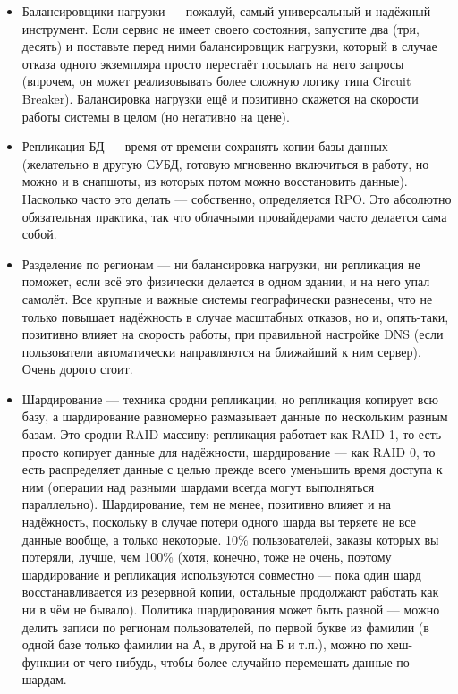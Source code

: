 \documentclass[a5paper]{article}
\begin{document}
\begin{itemize}
    \item Балансировщики нагрузки --- пожалуй, самый универсальный и надёжный инструмент. Если сервис не имеет своего состояния, запустите два (три, десять) и поставьте перед ними балансировщик нагрузки, который в случае отказа одного экземпляра просто перестаёт посылать на него запросы (впрочем, он может реализовывать более сложную логику типа Circuit Breaker). Балансировка нагрузки ещё и позитивно скажется на скорости работы системы в целом (но негативно на цене).
    \item Репликация БД --- время от времени сохранять копии базы данных (желательно в другую СУБД, готовую мгновенно включиться в работу, но можно и в снапшоты, из которых потом можно восстановить данные). Насколько часто это делать --- собственно, определяется RPO. Это абсолютно обязательная практика, так что облачными провайдерами часто делается сама собой.
    \item Разделение по регионам --- ни балансировка нагрузки, ни репликация не поможет, если всё это физически делается в одном здании, и на него упал самолёт. Все крупные и важные системы географически разнесены, что не только повышает надёжность в случае масштабных отказов, но и, опять-таки, позитивно влияет на скорость работы, при правильной настройке DNS (если пользователи автоматически направляются на ближайший к ним сервер). Очень дорого стоит.
    \item Шардирование --- техника сродни репликации, но репликация копирует всю базу, а шардирование равномерно размазывает данные по нескольким разным базам. Это сродни RAID-массиву: репликация работает как RAID 1, то есть просто копирует данные для надёжности, шардирование --- как RAID 0, то есть распределяет данные с целью прежде всего уменьшить время доступа к ним (операции над разными шардами всегда могут выполняться параллельно). Шардирование, тем не менее, позитивно влияет и на надёжность, поскольку в случае потери одного шарда вы теряете не все данные вообще, а только некоторые. 10\% пользователей, заказы которых вы потеряли, лучше, чем 100\% (хотя, конечно, тоже не очень, поэтому шардирование и репликация используются совместно --- пока один шард восстанавливается из резервной копии, остальные продолжают работать как ни в чём не бывало). Политика шардирования может быть разной --- можно делить записи по регионам пользователей, по первой букве из фамилии (в одной базе только фамилии на А, в другой на Б и т.п.), можно по хеш-функции от чего-нибудь, чтобы более случайно перемешать данные по шардам.
\end{itemize}
\end{document}
